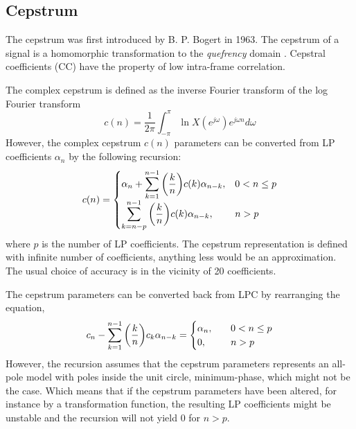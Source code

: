 \subsection{Cepstrum} %
\label{sub:cepstrum}
The cepstrum was first introduced by B. P. Bogert \etal \cite{bogert63} in 1963. The cepstrum of a signal is a homomorphic transformation to the \emph{quefrency} domain \cite{taletek}. Cepstral coefficients (CC) have the property of low intra-frame correlation.

The complex cepstrum is defined as the inverse Fourier transform of the log Fourier transform
\begin{equation}
	c(n) = \frac{1}{2\pi}\int_{-\pi}^{\pi} \ln X(e^{j\omega}) e^{j\omega n}d\omega
	\label{eq:complex_cepstrum}
\end{equation}
However, the complex cepstrum $c(n)$ parameters can be converted from LP coefficients $\alpha_n$ by the following recursion:
\begin{equation}
	c(n) = \begin{cases}
		\alpha_n+{\displaystyle\sum_{k=1}^{n-1} \left(\frac{k}{n}\right)} c(k) \alpha_{n-k}, & 0<n\leq p\\
		{\displaystyle\sum_{k=n-p}^{n-1} \left(\frac{k}{n}\right)} c(k) \alpha_{n-k}, & n > p\\
	\end{cases}
	\label{eq:ar2cc}
\end{equation}
where $p$ is the number of LP coefficients. The cepstrum representation is defined with infinite number of coefficients, anything less would be an approximation. The usual choice of accuracy is in the vicinity of 20 coefficients.

The cepstrum parameters can be converted back from LPC by rearranging the equation,
\begin{equation}
	c_n-{\displaystyle\sum_{k=1}^{n-1} \left(\frac{k}{n}\right)} c_k \alpha_{n-k} = \begin{cases}
		\alpha_n, &\quad 0< n \leq p\\
		0, &\quad n > p
	\end{cases}
	\label{eq:cc2ar}
\end{equation}
However, the recursion assumes that the cepstrum parameters represents an all-pole model with poles inside the unit circle, minimum-phase, which might not be the case. Which means that if the cepstrum parameters have been altered, for instance by a transformation function, the resulting LP coefficients might be unstable and the recursion will not yield 0 for $n>p$.  

